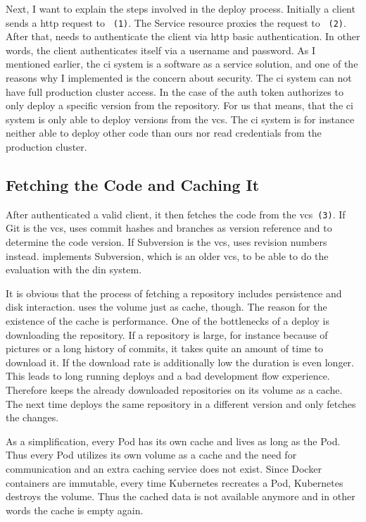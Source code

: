 Next, I want to explain the steps involved in the deploy process. Initially a client
sends a \gls{http} request to \deployer{}~\texttt{(1)}. The Service resource proxies the request
to \deployer{}~\texttt{(2)}. After that, \deployer{} needs to authenticate the client via \gls{http}
basic authentication. In other words, the client authenticates itself via a username and
password. As I mentioned earlier, the \gls{ci} system is a software as a service solution,
and one of the reasons why I implemented \deployer{} is the concern about security. The
\gls{ci} system can not have full production cluster access. In the case of \deployer{} the
auth token authorizes to only deploy a specific version from the repository. For us that
means, that the \gls{ci} system is only able to deploy versions from the \gls{vcs}. The
\gls{ci} system is for instance neither able to deploy other code than ours nor read
credentials from the production cluster.

\subsection{Fetching the Code and Caching It}
\label{sec:cache}

After \deployer{} authenticated a valid client, it then fetches the code from the
\gls{vcs}~\texttt{(3)}. If Git is the \gls{vcs}, \deployer{} uses commit hashes and branches
as version reference and to determine the code version. If Subversion is the \gls{vcs},
\deployer{} uses revision numbers instead. \deployer{} implements Subversion, which is an
older \gls{vcs}, to be able to do the evaluation with the \gls{din} system.

It is obvious that the process of fetching a repository includes persistence and disk
interaction. \deployer{} uses the volume just as cache, though. The reason for the existence
of the cache is performance. One of the bottlenecks of a deploy is downloading the
repository. If a repository is large, for instance because of pictures or a long history
of commits, it takes quite an amount of time to download it. If the download rate is
additionally low the duration is even longer. This leads to long running deploys and a bad
development flow experience. Therefore \deployer{} keeps the already downloaded repositories
on its volume as a cache. The next time \deployer{} deploys the same repository in a
different version and \deployer{} only fetches the changes.

As a simplification, every Pod has its own cache and lives as long as the Pod. Thus every
Pod utilizes its own volume as a cache and the need for communication and an extra caching
service does not exist. Since Docker containers are immutable, every time Kubernetes
recreates a Pod, Kubernetes destroys the volume. Thus the cached data is not available
anymore and in other words the cache is empty again.

